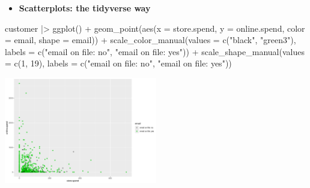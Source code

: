 \documentclass[
  ignorenonframetext,
]{beamer}
\newenvironment{Shaded}{\begin{snugshade}}{\end{snugshade}}
\newcommand{\AttributeTok}[1]{\textcolor[rgb]{0.40,0.45,0.13}{#1}}
\newcommand{\DecValTok}[1]{\textcolor[rgb]{0.68,0.00,0.00}{#1}}
\newcommand{\FunctionTok}[1]{\textcolor[rgb]{0.28,0.35,0.67}{#1}}
\newcommand{\NormalTok}[1]{\textcolor[rgb]{0.00,0.23,0.31}{#1}}
\newcommand{\SpecialCharTok}[1]{\textcolor[rgb]{0.37,0.37,0.37}{#1}}
\newcommand{\StringTok}[1]{\textcolor[rgb]{0.13,0.47,0.30}{#1}}
\providecommand{\tightlist}{%
  \setlength{\itemsep}{0pt}\setlength{\parskip}{0pt}}\usepackage{longtable,booktabs,array}
\begin{document}
\begin{frame}[fragile]{}
\label{section-14}
\begin{itemize}
\tightlist
\item
  \textbf{Scatterplots: the tidyverse way}
\end{itemize}

\tiny

\begin{Shaded}
\begin{Highlighting}[]
\NormalTok{customer }\SpecialCharTok{|\textgreater{}} \FunctionTok{ggplot}\NormalTok{() }\SpecialCharTok{+}
  \FunctionTok{geom\_point}\NormalTok{(}\FunctionTok{aes}\NormalTok{(}\AttributeTok{x =}\NormalTok{ store.spend, }\AttributeTok{y =}\NormalTok{ online.spend, }\AttributeTok{color =}\NormalTok{ email, }\AttributeTok{shape =}\NormalTok{ email)) }\SpecialCharTok{+}
  \FunctionTok{scale\_color\_manual}\NormalTok{(}\AttributeTok{values =} \FunctionTok{c}\NormalTok{(}\StringTok{"black"}\NormalTok{, }\StringTok{"green3"}\NormalTok{), }\AttributeTok{labels =} \FunctionTok{c}\NormalTok{(}\StringTok{"email on file: no"}\NormalTok{, }\StringTok{"email on file: yes"}\NormalTok{)) }\SpecialCharTok{+}
  \FunctionTok{scale\_shape\_manual}\NormalTok{(}\AttributeTok{values =} \FunctionTok{c}\NormalTok{(}\DecValTok{1}\NormalTok{, }\DecValTok{19}\NormalTok{), }\AttributeTok{labels =} \FunctionTok{c}\NormalTok{(}\StringTok{"email on file: no"}\NormalTok{, }\StringTok{"email on file: yes"}\NormalTok{))}
\end{Highlighting}
\end{Shaded}

\begin{center}
\includegraphics[width=0.5\textwidth,height=\textheight]{004_relationships_between_continuous_variables_files/figure-beamer/unnamed-chunk-12-1.pdf}
\end{center}
\end{frame}
\end{document}
